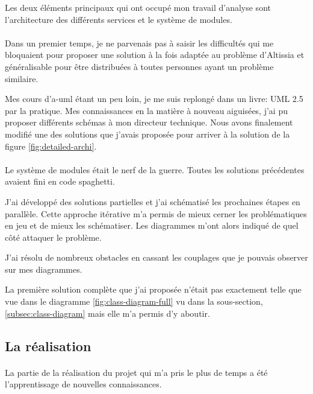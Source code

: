 Les deux éléments principaux qui ont occupé mon travail d'analyse sont l'architecture des différents services et le système de modules.

\paragraph{}
Dans un premier temps, je ne parvenais pas à saisir les difficultés qui me bloquaient pour proposer une solution à la fois adaptée au problème d'Altissia et généralisable pour être distribuées à toutes personnes ayant un problème similaire.

Mes cours d'\gls{a-uml} étant un peu loin, je me suis replongé dans un livre: UML 2.5 par la pratique\cite{roques_uml_2018}.
Mes connaissances en la matière à nouveau aiguisées, j'ai pu proposer différents schémas à mon directeur technique.
Nous avons finalement modifié une des solutions que j'avais proposée pour arriver à la solution de la figure \ref{fig:detailed-archi}.

\paragraph{}
Le système de modules était le nerf de la guerre.
Toutes les solutions précédentes avaient fini en code spaghetti\fnmark{}.

J'ai développé des solutions partielles et j'ai schématisé les prochaines étapes en parallèle.
Cette approche itérative m'a permis de mieux cerner les problématiques en jeu et de mieux les schématiser.
Les diagrammes m'ont alors indiqué de quel côté attaquer le problème.

J'ai résolu de nombreux obstacles en cassant les couplages que je pouvais observer sur mes diagrammes.

La première solution complète que j'ai proposée n'était pas exactement telle que vue dans le diagramme \ref{fig:class-diagram-full} vu dans la sous-section, \ref{subsec:class-diagram} mais elle m'a permis d'y aboutir.

\subsection{La réalisation}
\label{subsec:realisation}

\paragraph{}
La partie de la réalisation du projet qui m'a pris le plus de temps a été l'apprentissage de nouvelles connaissances.

